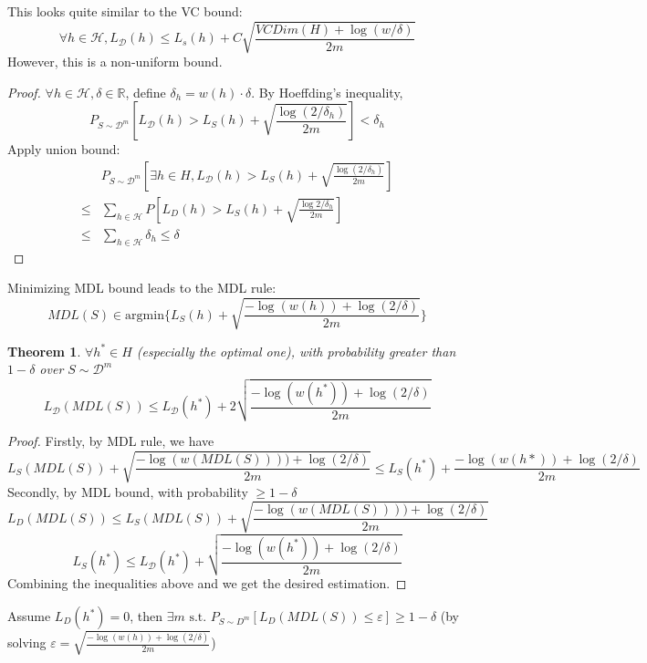 \documentclass{book}
\newcommand{\R}{\mathbb{R}}
\newcommand{\st}{\text{ s.t. }}
\renewcommand{\H}{\mathcal{H}}
\newcommand{\D}{\mathcal{D}}
\newtheorem{Thm}{Theorem}[section]
\begin{document}
This looks quite similar to the VC bound:
\begin{equation}
\forall h\in \H, L_{\D} \left( h \right)\leq L_s \left( h \right)+C \sqrt{\frac{VCDim \left( H \right)+\log \left( w/\delta \right)}{2m}}
\end{equation}
However, this is a non-uniform bound.

\begin{proof}
  $\forall h\in \H,\delta\in\R$, define $\delta_{h}=w(h)\cdot \delta$. By Hoeffding's inequality, \[P_{S\sim \D^m}[L_{\D}(h)>L_{S}(h)+\sqrt{\frac{\log(2/\delta_{h})}{2m}}]<\delta_{h}\]
  Apply union bound:
\begin{align*}
  &P_{S\sim \D^{m}}\left[ \exists h\in H, L_{\D} \left( h \right)> L_S \left( h \right)+\sqrt{\frac{\log \left( 2/\delta_h \right)}{2m}} \right]\\
  \leq &\sum_{h\in\H}P \left[ L_D \left( h \right)> L_S \left( h \right)+\sqrt{\frac{\log 2/\delta_h}{2m}} \right]\\
  \leq &\sum_{h\in\H}\delta_h\leq \delta
\end{align*}
\end{proof}

Minimizing MDL bound leads to the MDL rule:
\[MDL(S)\in \mathrm{argmin}\{L_{S}(h)+\sqrt{\frac{-\log(w(h))+\log(2/\delta)}{2m}}\}\]

\begin{Thm}
  $\forall h^{*}\in H$ (especially the optimal one), with probability greater than $1-\delta$ over $S\sim \D^m$
  \[L_{\D}(MDL(S))\leq L_{\D}(h^{*})+2\sqrt{\frac{-\log(w(h^{*}))+\log(2/\delta)}{2m}}\]
\end{Thm}

\begin{proof}
  Firstly, by MDL rule, we have
  \[L_{S}(MDL(S))+\sqrt{\frac{-\log(w(MDL(S))))+\log(2/\delta)}{2m}}\leq L_{S}(h^{*})+\frac{-\log(w(h*))+\log(2/\delta)}{2m}\]
  Secondly, by MDL bound, with probability $\geq 1-\delta$
  \[L_{D}(MDL(S))\leq L_{S}(MDL(S))+\sqrt{\frac{-\log(w(MDL(S))))+\log(2/\delta)}{2m}}\]
\begin{equation}
L_S(h^{*})\leq L_{\D}(h^{*})+\sqrt{\frac{-\log \left( w(h^{*}) \right)+\log( 2/\delta)}{2m}}
\end{equation}
Combining the inequalities above and we get the desired estimation.
\end{proof}

Assume $L_{D}(h^{*})=0$, then $\exists m\st P_{S\sim D^{m}}[L_{D}(MDL(S))\leq\varepsilon]\geq 1-\delta$ (by solving $\varepsilon=\sqrt{\frac{-\log(w(h))+\log(2/\delta)}{2m}}$)
\end{document}
